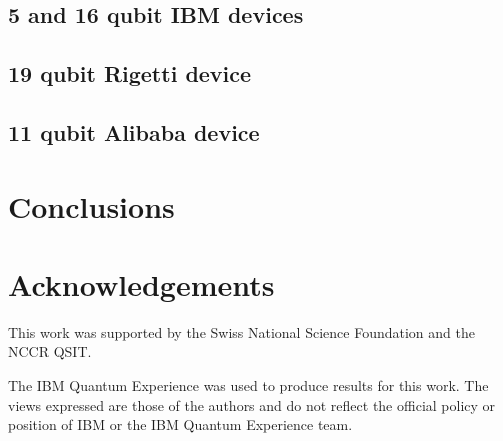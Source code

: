 \documentclass[aps,prl,twocolumn,showpacs,preprintnumbers]{revtex4-1}
\begin{document}
\subsection{5 and 16 qubit IBM devices}


\subsection{19 qubit Rigetti device}


\subsection{11 qubit Alibaba device}



\section{Conclusions}






\section{Acknowledgements}

This work was supported by the Swiss National Science Foundation and the NCCR QSIT.

The IBM Quantum Experience was used to produce results for this work. The views expressed are those of the authors and do not reflect the official policy or position of IBM or the IBM Quantum Experience team.



\end{document}
